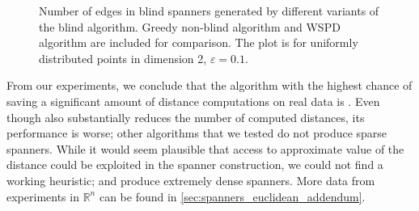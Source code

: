 \documentclass[]{ws-ijcga}
\newcommand{\eps}{\varepsilon}
\newcommand{\RR}{\mathbb{R}}
\def \expDistDataPath {./}
\begin{document}
\begin{figure}[!htbp]
    \begin{centering}
\end{centering}
    \caption{Number of edges in blind spanners generated by different variants of the blind
    algorithm. Greedy non-blind algorithm and WSPD algorithm are included for comparison. The plot is for uniformly distributed points
    in dimension 2, $\eps = 0.1$.}
    \label{fig:spanner_sparseness}
\end{figure}



From our experiments, we conclude that the algorithm with the highest chance
of saving a significant amount of distance computations on real data is \bgrdy. 
Even though \brndm also substantially reduces
the number of computed distances, its performance is worse;
other algorithms that we tested do not produce sparse spanners.
While it would seem plausible that access to approximate value of the distance
could be exploited in the spanner construction,
we could not find a working heuristic; \bqsgrdy and \bqsshaker produce extremely
dense spanners. More data from experiments in $\RR^n$ can be found in
\ref{sec:spanners_euclidean_addendum}.
\end{document}
